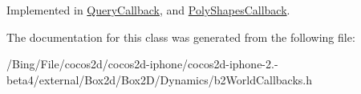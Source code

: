 Implemented in \hyperlink{class_query_callback_ac79cf9e2008bdea68ab3d9d64811dc62}{Query\-Callback}, and \hyperlink{class_poly_shapes_callback_a35de1a0c75426d04a4a6f110e2ef03c8}{Poly\-Shapes\-Callback}.



The documentation for this class was generated from the following file\-:\begin{DoxyCompactItemize}
\item 
/\-Bing/\-File/cocos2d/cocos2d-\/iphone/cocos2d-\/iphone-\/2.-\/beta4/external/\-Box2d/\-Box2\-D/\-Dynamics/b2\-World\-Callbacks.\-h\end{DoxyCompactItemize}
